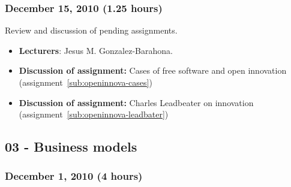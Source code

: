 \documentclass[a4paper]{article}
\begin{document}
\subsubsection{December 15, 2010 (1.25 hours)}

Review and discussion of pending assignments.

\begin{itemize}
 \item \textbf{Lecturers}: Jesus M. Gonzalez-Barahona.
\item \textbf{Discussion of assignment:} Cases of free software and open innovation (assignment~\ref{sub:openinnova-cases})
\item \textbf{Discussion of assignment:} Charles Leadbeater on innovation (assignment~\ref{sub:openinnova-leadbater})
\end{itemize}

\subsection{03 - Business models}

\subsubsection{December 1, 2010 (4 hours)}
\end{document}

